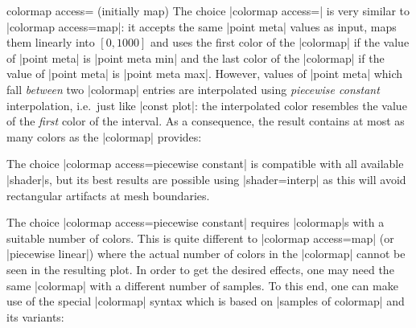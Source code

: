 \begin{pgfplotskey}{colormap access= (initially map)}
	The choice |colormap access=| is very similar to |colormap access=map|: it accepts the same |point meta| values as input, maps them linearly into $[0,1000]$ and uses the first color of the |colormap| if the value of |point meta| is |point meta min| and the last color of the |colormap| if the value of |point meta| is |point meta max|. However, values of |point meta| which fall \emph{between} two |colormap| entries are interpolated using \emph{piecewise constant} interpolation, i.e.\ just like |const plot|: the interpolated color resembles the value of the \emph{first} color of the interval. As a consequence, the result contains at most  as many colors as the |colormap| provides:
\begin{codeexample}[]
\end{codeexample}
	The choice |colormap access=piecewise constant| is compatible with all available |shader|s, but its best results are possible using |shader=interp| as this will avoid rectangular artifacts at mesh boundaries.
\begin{codeexample}[]
\end{codeexample}

	The choice |colormap access=piecewise constant| requires |colormap|s with a suitable number of colors. This is quite different to |colormap access=map| (or |piecewise linear|) where the actual number of colors in the |colormap| cannot be seen in the resulting plot. In order to get the desired effects, one may need the same |colormap| with a different number of samples. To this end, one can make use of the special |colormap| syntax which is based on |samples of colormap| and its variants:


\end{pgfplotskey}
